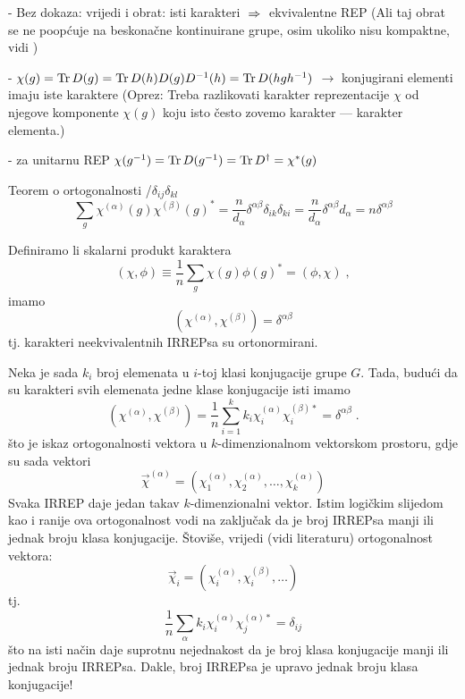 - Bez dokaza: vrijedi i obrat: isti karakteri $\;\Rightarrow\;$ ekvivalentne REP
  (Ali taj obrat se ne poopćuje na beskonačne kontinuirane grupe, osim
  ukoliko nisu kompaktne, vidi \cite[302]{Cornwell:1997})

- $\chi(g)=\operatorname{Tr} D(g) = \operatorname{Tr} D(h) D(g) D^{-1}(h) = \operatorname{Tr} D(hgh^{-1})$
  $\to$ konjugirani elementi imaju iste karaktere (Oprez: Treba
  razlikovati karakter reprezentacije $\chi$ od njegove komponente
  $\chi(g)$ koju isto često zovemo karakter --- karakter elementa.)

- za unitarnu REP $\chi(g^{-1}) = \operatorname{Tr} D(g^{-1})= \operatorname{Tr} D^{\dagger}
    = \chi^{*}(g)$


Teorem o ortogonalnosti  /$\delta_{ij}\delta_{kl}$
\begin{displaymath}
\sum_g \chi^{(\alpha)}(g) \chi^{(\beta)}(g)^* = 
\frac{n}{d_{\alpha}} \delta^{\alpha\beta} \delta_{ik}\delta_{ki} =
\frac{n}{d_{\alpha}} \delta^{\alpha\beta} d_{\alpha} =
n \delta^{\alpha\beta} 
\end{displaymath}

Definiramo li skalarni produkt karaktera
 \begin{displaymath}
(\chi, \phi) \equiv \frac{1}{n} \sum_g \chi(g) \phi(g)^* = (\phi, \chi) \;,
\end{displaymath}
imamo
\begin{displaymath}
(\chi^{(\alpha)}, \chi^{(\beta)}) = \delta^{\alpha\beta}
\end{displaymath}
tj. karakteri neekvivalentnih IRREPsa su ortonormirani.

Neka je sada $k_i$ broj elemenata u $i$-toj klasi konjugacije grupe $G$.
Tada, budući da su karakteri svih elemenata jedne klase konjugacije
isti imamo
\begin{displaymath}
(\chi^{(\alpha)}, \chi^{(\beta)})=\frac{1}{n} \sum_{i=1}^{k}  k_i
 \chi^{(\alpha)}_i \chi^{(\beta)*}_{i} = \delta^{\alpha\beta} \;.
\end{displaymath}
što je iskaz ortogonalnosti vektora u $k$-dimenzionalnom vektorskom
prostoru, gdje su sada vektori
\begin{displaymath}
\vec{\chi}^{(\alpha)} = (\chi^{(\alpha)}_1, \chi^{(\alpha)}_2, \ldots,
 \chi^{(\alpha)}_{k})
\end{displaymath}
Svaka IRREP daje jedan takav $k$-dimenzionalni vektor.
Istim logičkim slijedom kao i ranije ova ortogonalnost vodi na zaključak 
da je broj
IRREPsa  manji ili jednak broju klasa konjugacije. Štoviše, vrijedi
(vidi literaturu) ortogonalnost vektora:
\begin{displaymath}
\vec{\chi}_i = (\chi^{(\alpha)}_i, \chi^{(\beta)}_i, \ldots)
\end{displaymath}
tj.
\begin{displaymath}
\frac{1}{n} \sum_{\alpha} k_i \chi^{(\alpha)}_i \chi^{(\alpha)*}_j =
\delta_{ij}
\end{displaymath}
što na isti način daje suprotnu nejednakost da je broj klasa konjugacije manji
ili jednak broju IRREPsa.
Dakle, broj IRREPsa je upravo jednak broju klasa konjugacije!

